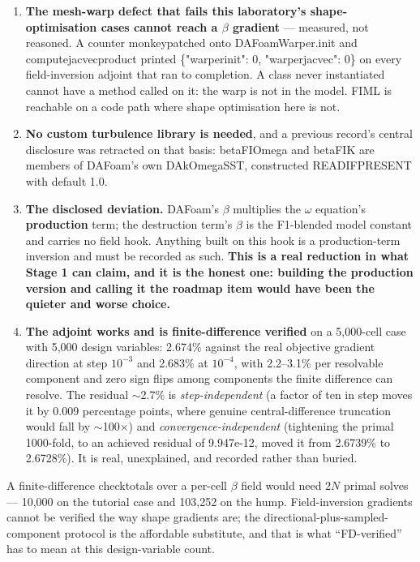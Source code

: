 \documentclass[11pt,a4paper]{article}
\newcommand{\breakus}{\textunderscore\allowbreak}
\newcommand{\code}[1]{{\small\ttfamily\let\_\breakus #1}}
\begin{document}
\begin{enumerate}
\item \textbf{The mesh-warp defect that fails this laboratory's shape-optimisation cases
  cannot reach a $\beta$ gradient} --- measured, not reasoned. A counter monkeypatched onto
  \code{DAFoamWarper.\_\_init\_\_} and \code{compute\_jacvec\_product} printed
  \code{\{"warper\_init": 0, "warper\_jacvec": 0\}} on every field-inversion adjoint that
  ran to completion. A class never instantiated cannot have a method called on it: the warp
  is not in the model. FIML is reachable on a code path where shape optimisation here is
  not.
\item \textbf{No custom turbulence library is needed}, and a previous record's central
  disclosure was retracted on that basis: \code{betaFIOmega\_} and \code{betaFIK\_} are
  members of DAFoam's own \code{DAkOmegaSST}, constructed \code{READ\_IF\_PRESENT} with
  default 1.0.
\item \textbf{The disclosed deviation.} DAFoam's $\beta$ multiplies the $\omega$ equation's
  \textbf{production} term; the destruction term's $\beta$ is the F1-blended model constant
  and carries no field hook. Anything built on this hook is a production-term inversion and
  must be recorded as such. \textbf{This is a real reduction in what Stage 1 can claim, and
  it is the honest one: building the production version and calling it the roadmap item
  would have been the quieter and worse choice.}
\item \textbf{The adjoint works and is finite-difference verified} on a 5{,}000-cell case
  with 5{,}000 design variables: 2.674\% against the real objective gradient direction at
  step $10^{-3}$ and 2.683\% at $10^{-4}$, with 2.2--3.1\% per resolvable component and
  zero sign flips among components the finite difference can resolve. The residual
  $\sim$2.7\% is \emph{step-independent} (a factor of ten in step moves it by 0.009
  percentage points, where genuine central-difference truncation would fall by
  $\sim$100$\times$) and \emph{convergence-independent} (tightening the primal 1000-fold,
  to an achieved residual of 9.947e-12, moved it from 2.6739\% to 2.6728\%). It is real,
  unexplained, and recorded rather than buried.
\end{enumerate}

A finite-difference \code{check\_totals} over a per-cell $\beta$ field would need $2N$
primal solves --- 10{,}000 on the tutorial case and 103{,}252 on the hump. Field-inversion
gradients cannot be verified the way shape gradients are; the directional-plus-sampled-component
protocol is the affordable substitute, and that is what ``FD-verified'' has to mean at this
design-variable count.
\end{document}
